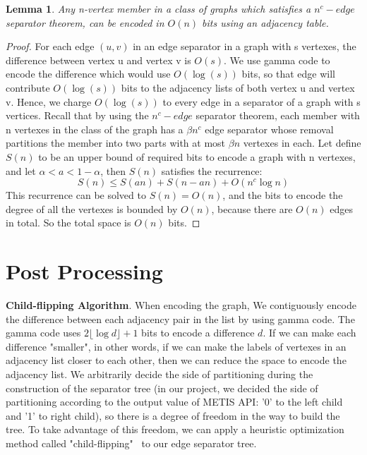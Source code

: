 \documentclass[12pt,glossary]{dalthesis}
\newtheorem{lemma}[theorem]{Lemma}
\begin{document}
\bigskip
\begin{lemma}
Any n-vertex member in a class of graphs which satisfies a $n^{c}-edge$ separator
theorem, can be encoded in $O(n)$ bits using an adjacency table.
\end{lemma}


\begin{proof}
For each edge $(u, v)$ in an edge separator in a graph with s vertexes, the difference
between vertex u and vertex v is $O(s)$. We use gamma code to encode the difference which would use $O(\log (s))$ bits, so that edge will contribute $O(\log (s))$ bits to the adjacency lists of both vertex u and vertex v. Hence, we charge $O(\log (s))$ to every edge in a separator of a graph with s vertices. Recall that by using the $n^{c}- edge$ separator theorem, each member with n vertexes in the class of the graph has a $\beta n^{c}$ edge separator whose removal partitions the member into two parts with at most $\beta n$ vertexes in each. Let define $S(n)$ to be an upper bound of required bits to encode a graph with n vertexes, and let $\alpha < a < 1 - \alpha $, then $S(n)$ satisfies the recurrence:
\[ S(n) \leq S(an) + S(n-an) + O(n^{c} \log n) \]
This recurrence can be solved to $S(n) = O(n)$, and the bits to encode the degree of all the vertexes is bounded by $O(n)$, because there are $O(n)$ edges in total. So the total space is $O(n)$ bits.
\end{proof}

\bigskip
\bigskip

\section{Post Processing}

\textbf{Child-flipping Algorithm}. When encoding the graph, We contiguously encode the difference between each adjacency pair in the list by using gamma code. The gamma code uses $2\lfloor \log d \rfloor + 1$ bits to encode a difference $d$. If we can make each difference "smaller", in other words, if we can make the labels of vertexes in an adjacency list closer to each other, then we can reduce the space to encode the adjacency list. We arbitrarily decide the side of partitioning during the construction of the separator tree (in our project, we decided the side of partitioning according to the output value of METIS API: '0' to the left child and '1' to right child), so there is a degree of freedom in the way to build the tree. To take advantage of this freedom, we can apply a heuristic optimization method called "child-flipping"~\cite{compact-representation} to our edge separator tree.
\end{document}
